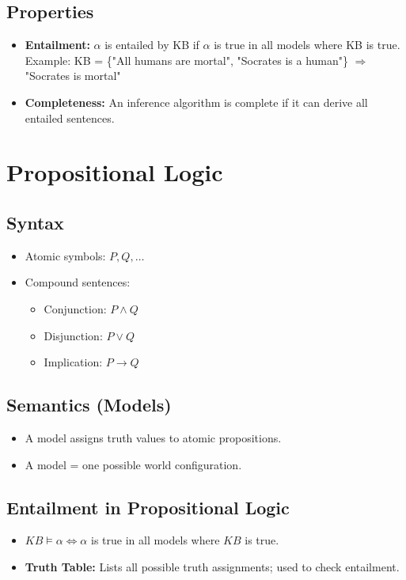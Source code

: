 \subsection{Properties}
\begin{itemize}
    \item \textbf{Entailment:} $\alpha$ is entailed by KB if $\alpha$ is true in all models where KB is true.  
    Example:  
    KB = \{"All humans are mortal", "Socrates is a human"\}  
    $\Rightarrow$ "Socrates is mortal"
    \item \textbf{Completeness:} An inference algorithm is complete if it can derive all entailed sentences.
\end{itemize}

\section{Propositional Logic}

\subsection{Syntax}
\begin{itemize}
    \item Atomic symbols: $P, Q, \dots$
    \item Compound sentences:
    \begin{itemize}
        \item Conjunction: $P \land Q$
        \item Disjunction: $P \lor Q$
        \item Implication: $P \rightarrow Q$
    \end{itemize}
\end{itemize}

\subsection{Semantics (Models)}
\begin{itemize}
    \item A model assigns truth values to atomic propositions.
    \item A model = one possible world configuration.
\end{itemize}

\subsection{Entailment in Propositional Logic}
\begin{itemize}
    \item $KB \models \alpha \iff \alpha$ is true in all models where $KB$ is true.
    \item \textbf{Truth Table:} Lists all possible truth assignments; used to check entailment.
\end{itemize}

